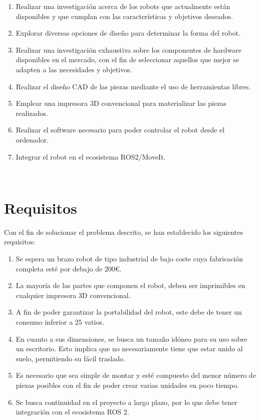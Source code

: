 \begin{enumerate}
    \item Realizar una investigación acerca de los robots que actualmente están disponibles y que cumplan con 
          las características y objetivos deseados. 
    \item Explorar diversas opciones de diseño para determinar la forma del robot. 
      
    \item Realizar una investigación exhaustiva sobre los componentes de hardware disponibles en el mercado, con el fin de seleccionar 
          aquellos que mejor se adapten a las necesidades y objetivos.
    
    \item Realizar el diseño \acs{CAD} de las piezas mediante el uso de herramientas libres. 

    \item Emplear una impresora 3D convencional para materializar las piezas realizados.

    \item Realizar el software necesario para poder controlar el robot desde el ordenador.

    \item Integrar el robot en el ecosistema \ac{ROS}2/MoveIt. 
 
\end{enumerate}\

\section{Requisitos}
\label{sec:requisitos}
Con el fin de solucionar el problema descrito, se han establecido los siguientes requisitos:
\begin{enumerate}
      \item Se espera un brazo robot de tipo industrial de bajo coste cuya fabricación completa esté por debajo de 200\euro.
      \item La mayoría de las partes que componen el robot, deben ser imprimibles en cualquier impresora 3D convencional.
      \item A fin de poder garantizar la portabilidad del robot, este debe de tener un consumo inferior a 25 vatios.
      \item En cuanto a sus dimensiones, se busca un tamaño idóneo para su uso sobre un escritorio. Esto implica que no necesariamente 
      tiene que estar unido al suelo, permitiendo su fácil traslado.
      \item Es necesario que sea simple de montar y esté compuesto del menor número de piezas posibles con el fin de poder crear varias unidades 
      en poco tiempo. 
      \item Se busca continuidad en el proyecto a largo plazo, por lo que debe tener integración con el ecosistema \acs{ROS} 2. 

\end{enumerate}\


